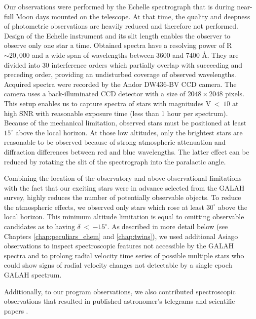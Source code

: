 Our observations were performed by the Echelle spectrograph that is during near-full Moon days mounted on the telescope. At that time, the quality and deepness of photometric observations are heavily reduced and therefore not performed. Design of the Echelle instrument and its slit length enables the observer to observe only one star a time. Obtained spectra have a resolving power of R$\sim20,000$ and a wide span of wavelengths between $3600$ and $7400$ \AA. They are divided into 30 interference orders which partially overlap with succeeding and preceding order, providing an undisturbed coverage of observed wavelengths. Acquired spectra were recorded by the Andor DW436-BV CCD camera. The camera uses a back-illuminated CCD detector with a size of $2048 \times 2048$ pixels. This setup enables us to capture spectra of stars with magnitudes V~<~$10$ at high SNR with reasonable exposure time (less than 1 hour per spectrum). Because of the mechanical limitation, observed stars must be positioned at least $15^\circ$ above the local horizon. At those low altitudes, only the brightest stars are reasonable to be observed because of strong atmospheric attenuation and diffraction differences between red and blue wavelengths. The latter effect can be reduced by rotating the slit of the spectrograph into the paralactic angle.

Combining the location of the observatory and above observational limitations with the fact that our exciting stars were in advance selected from the GALAH survey, highly reduces the number of potentially observable objects. To reduce the atmospheric effects, we observed only stars which rose at least $30^\circ$ above the local horizon. This minimum altitude limitation is equal to omitting observable candidates as to having $\delta$~<~$-15^\circ$. As described in more detail below (see Chapters \ref{chap:peculiars_chem} and \ref{chap:twins}), we used additional Asiago observations to inspect spectroscopic features not accessible by the GALAH spectra and to prolong radial velocity time series of possible multiple stars who could show signs of radial velocity changes not detectable by a single epoch GALAH spectrum.

Additionally, to our program observations, we also contributed spectroscopic observations that resulted in published astronomer's telegrams \cite{2019ATel13340....1M} and scientific papers \cite{2019MNRAS.488.5536M}.